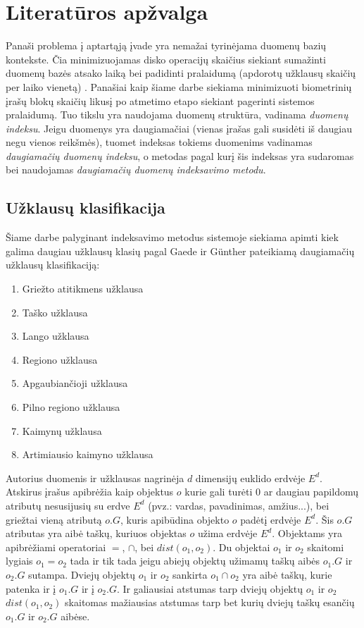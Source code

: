 \section{Literatūros apžvalga}

Panaši problema į aptartąją įvade yra nemažai tyrinėjama duomenų bazių kontekste.
Čia minimizuojamas disko operacijų skaičius siekiant sumažinti duomenų bazės atsako laiką bei padidinti pralaidumą (apdorotų užklausų skaičių per laiko vienetą) \cite{garcia2000database}.
Panašiai kaip šiame darbe siekiama minimizuoti biometrinių įrašų blokų skaičių likusį po atmetimo etapo siekiant pagerinti sistemos \cite{NeurotechnologyMegamatcherAccelerator} pralaidumą.
Tuo tikslu yra naudojama duomenų struktūra, vadinama {\it duomenų indeksu}.
Jeigu duomenys yra daugiamačiai (vienas įrašas gali susidėti iš daugiau negu vienos reikšmės), tuomet indeksas tokiems duomenims vadinamas {\it daugiamačių duomenų indeksu}, o metodas pagal kurį šis indeksas yra sudaromas bei naudojamas {\it daugiamačių duomenų indeksavimo metodu}.

\subsection{Užklausų klasifikacija}

Šiame darbe palyginant indeksavimo metodus sistemoje \cite{NeurotechnologyMegamatcherAccelerator} siekiama apimti kiek galima daugiau užklausų klasių pagal Gaede ir Günther \cite{gaede1998multidimensional} pateikiamą daugiamačių užklausų klasifikaciją:
\begin{enumerate}
	\item Griežto atitikmens užklausa
	\item Taško užklausa
	\item Lango užklausa
	\item Regiono užklausa
	\item Apgaubiančioji užklausa
	\item Pilno regiono užklausa
	\item Kaimynų užklausa
	\item Artimiausio kaimyno užklausa
\end{enumerate}

Autorius duomenis ir užklausas nagrinėja $d$ dimensijų euklido erdvėje $E^d$.
Atskirus įrašus apibrėžia kaip objektus $o$ kurie gali turėti 0 ar daugiau papildomų atributų nesusijusių su erdve $E^d$ (pvz.: vardas, pavadinimas, amžius...), bei griežtai vieną atributą $o.G$, kuris apibūdina objekto $o$ padėtį erdvėje $E^d$.
Šis $o.G$ atributas yra aibė taškų, kuriuos objektas $o$ užima erdvėje $E^d$.
Objektams yra apibrėžiami operatoriai $=$, $\cap$, bei $dist(o_1, o_2)$.
Du objektai $o_1$ ir $o_2$ skaitomi lygiais $o_1 = o_2$ tada ir tik tada jeigu abiejų objektų užimamų taškų aibės $o_1.G$ ir $o_2.G$ sutampa.
Dviejų objektų $o_1$ ir $o_2$ sankirta $o_1 \cap o_2$ yra aibė taškų, kurie patenka ir į $o_1.G$ ir į $o_2.G$.
Ir galiausiai atstumas tarp dviejų objektų $o_1$ ir $o_2$ $dist(o_1, o_2)$ skaitomas mažiausias atstumas tarp bet kurių dviejų taškų esančių $o_1.G$ ir $o_2.G$ aibėse.



